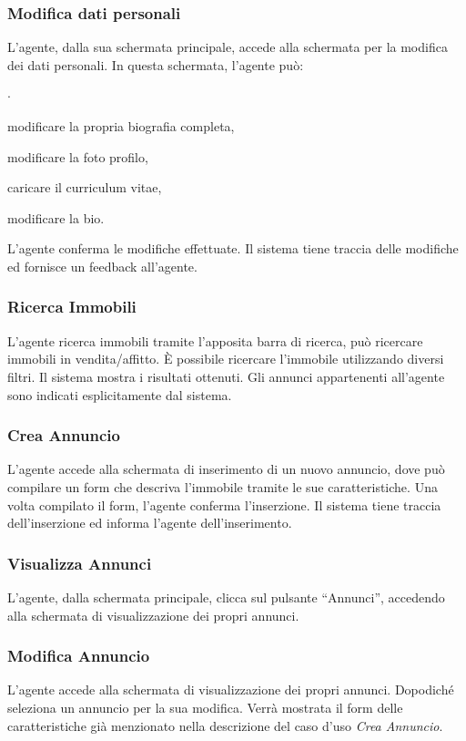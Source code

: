\subsubsection{Modifica dati personali}
L'agente, dalla sua schermata principale, accede alla schermata per la 
modifica dei dati personali. In questa schermata, l'agente può:
\begin{list}{$\cdot$}{}
    \item modificare la propria biografia completa,
    \item modificare la foto profilo,
    \item caricare il curriculum vitae,
    \item modificare la bio.
\end{list} 
L'agente conferma le modifiche effettuate. Il sistema tiene traccia 
delle modifiche ed fornisce un feedback all'agente.

\subsubsection{Ricerca Immobili}
L'agente ricerca immobili tramite l'apposita barra di ricerca, può 
ricercare immobili in vendita/affitto. È possibile ricercare l'immobile 
utilizzando diversi filtri. Il sistema mostra i risultati ottenuti. 
Gli annunci appartenenti all'agente sono indicati esplicitamente dal sistema.

\subsubsection{Crea Annuncio}
L'agente accede alla schermata di inserimento di un nuovo annuncio, dove 
può compilare un form che descriva l'immobile tramite le sue caratteristiche.
Una volta compilato il form, l'agente conferma l'inserzione. 
Il sistema tiene traccia dell'inserzione ed informa l'agente dell'inserimento.

\subsubsection{Visualizza Annunci}
L'agente, dalla schermata principale, clicca sul pulsante “Annunci”, accedendo 
alla schermata di visualizzazione dei propri annunci.

\subsubsection{Modifica Annuncio}
L'agente accede alla schermata di visualizzazione dei propri annunci. Dopodiché 
seleziona un annuncio per la sua modifica. Verrà mostrata il form delle 
caratteristiche già menzionato nella descrizione del caso d'uso \textit{Crea Annuncio}.

